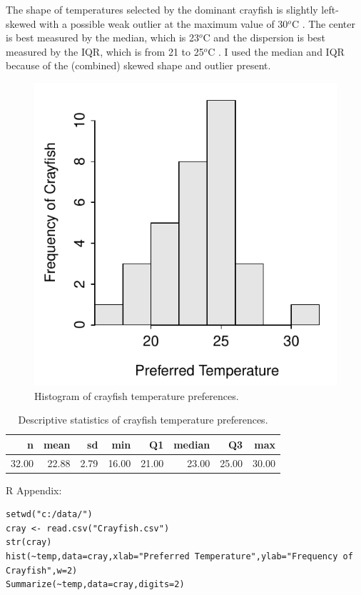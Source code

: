 \documentclass[10pt,openany]{book}\usepackage[]{graphicx}\usepackage[]{color}
\makeatletter
\newenvironment{kframe}{%
 \def\at@end@of@kframe{}%
 \ifinner\ifhmode%
  \def\at@end@of@kframe{\end{minipage}}%
  \begin{minipage}{\columnwidth}%
 \fi\fi%
 \def\FrameCommand##1{\hskip\@totalleftmargin \hskip-\fboxsep
 \colorbox{shadecolor}{##1}\hskip-\fboxsep
     \hskip-\linewidth \hskip-\@totalleftmargin \hskip\columnwidth}%
 \MakeFramed {\advance\hsize-\width
   \@totalleftmargin\z@ \linewidth\hsize
   \@setminipage}}%
 {\par\unskip\endMakeFramed%
 \at@end@of@kframe}
\newenvironment{knitrout}{}{} %
\makeatother
\begin{document}
The shape of temperatures selected by the dominant crayfish is slightly left-skewed  with a possible weak outlier at the maximum value of 30$^{o}$C . The center is best measured by the median, which is 23$^{o}$C  and the dispersion is best measured by the IQR, which is from 21 to 25$^{o}$C . I used the median and IQR because of the (combined) skewed shape and outlier present.

\begin{knitrout}
\color{fgcolor}\begin{figure}[hbtp]

{\centering \includegraphics[width=.4\linewidth]{Figs/CrayfishTempHist-1} 

}

\caption[Histogram of crayfish temperature preferences]{Histogram of crayfish temperature preferences.}\label{fig:CrayfishTempHist}
\end{figure}


\end{knitrout}

\begin{table}[ht]
\centering
\caption{Descriptive statistics of crayfish temperature preferences.} 
\label{tab:CrayfishTempStats}
\begin{tabular}{rrrrrrrr}
  \hline
n & mean & sd & min & Q1 & median & Q3 & max \\ 
  \hline
32.00 & 22.88 & 2.79 & 16.00 & 21.00 & 23.00 & 25.00 & 30.00 \\ 
   \hline
\end{tabular}
\end{table}


\begin{minipage}{\textwidth}
R Appendix:
\begin{knitrout}
\color{fgcolor}\begin{kframe}
\begin{verbatim}
setwd("c:/data/")
cray <- read.csv("Crayfish.csv")
str(cray)
hist(~temp,data=cray,xlab="Preferred Temperature",ylab="Frequency of Crayfish",w=2)
Summarize(~temp,data=cray,digits=2)
\end{verbatim}
\end{kframe}
\end{knitrout}
\end{minipage}
\end{document}
